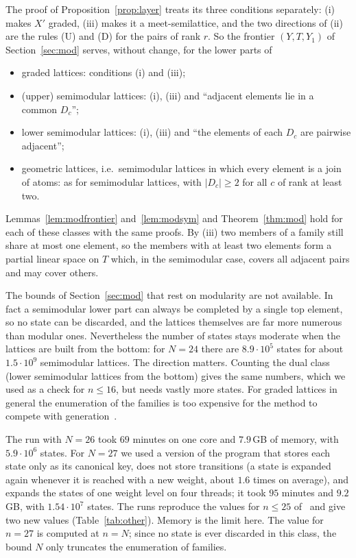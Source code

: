 \documentclass[11pt]{amsart}
\theoremstyle{definition}
\theoremstyle{remark}
\begin{document}
The proof of Proposition~\ref{prop:layer} treats its three conditions separately:
\textup{(i)} makes $X'$ graded, \textup{(iii)} makes it a meet-semilattice, and the two
directions of \textup{(ii)} are the rules (U) and (D) for the pairs of rank $r$.  So the
frontier $(Y,T,Y_1)$ of Section~\ref{sec:mod} serves, without change, for the lower parts of
\begin{itemize}
\item graded lattices: conditions (i) and (iii);
\item (upper) semimodular lattices: (i), (iii) and ``adjacent elements lie in a common $D_c$'';
\item lower semimodular lattices: (i), (iii) and ``the elements of each $D_c$ are pairwise adjacent'';
\item geometric lattices, i.e.\ semimodular lattices in which every element is a join of atoms:
      as for semimodular lattices, with $|D_c| \ge 2$ for all $c$ of rank at least two.
\end{itemize}
Lemmas~\ref{lem:modfrontier} and~\ref{lem:modsym} and Theorem~\ref{thm:mod} hold for each of
these classes with the same proofs.  By (iii) two members of a family still share at most
one element, so the members with at least two elements form a partial linear space on $T$
which, in the semimodular case, covers all adjacent pairs and may cover others.

The bounds of Section~\ref{sec:mod} that rest on modularity are not available.  In fact a
semimodular lower part can always be completed by a single top element, so no state can be
discarded, and the lattices themselves are far more numerous than modular ones.
Nevertheless the number of states stays moderate when the lattices are built from the bottom:
for $N = 24$ there are $8.9 \cdot 10^{5}$ states for about $1.5 \cdot 10^{9}$ semimodular
lattices.  The direction matters.  Counting the dual class (lower semimodular lattices from the
bottom) gives the same numbers, which we used as a check for $n \le 16$, but needs vastly more
states.  For graded lattices in general the enumeration of the families is too expensive for
the method to compete with generation~\cite{Koh19}.

The run with $N = 26$ took $69$ minutes on one core and $7.9$\,GB of memory, with
$5.9\cdot 10^{6}$ states.  For $N = 27$ we used a version of the program that stores each
state only as its canonical key, does not store transitions (a state is expanded again
whenever it is reached with a new weight, about $1.6$ times on average), and expands the
states of one weight level on four threads; it took $95$ minutes and $9.2$\,GB, with
$1.54\cdot 10^{7}$ states.  The runs reproduce the values for $n \le 25$ of~\cite{Koh19} and
give two new values (Table~\ref{tab:other}).  Memory is the limit here.  The value for $n=27$
is computed at $n = N$; since no state is ever discarded in this class, the bound $N$ only
truncates the enumeration of families.
\end{document}
